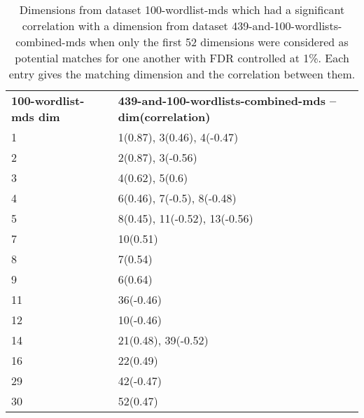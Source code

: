 \begin{table}[!tbp]
    \begin{tabular}{| p{0.75in}p{3.5in} |}
        \hline
        \textbf{100-wordlist-mds dim} & \textbf{439-and-100-wordlists-combined-mds -- dim(correlation)}\\
        1 & 1(0.87), 3(0.46), 4(-0.47)\\
        2 & 2(0.87), 3(-0.56)\\
        3 & 4(0.62), 5(0.6)\\
        4 & 6(0.46), 7(-0.5), 8(-0.48)\\
        5 & 8(0.45), 11(-0.52), 13(-0.56)\\
        7 & 10(0.51)\\
        8 & 7(0.54)\\
        9 & 6(0.64)\\
        11 & 36(-0.46)\\
        12 & 10(-0.46)\\
        14 & 21(0.48), 39(-0.52)\\
        16 & 22(0.49)\\
        29 & 42(-0.47)\\
        30 & 52(0.47)\\
        \hline
    \end{tabular}
    \caption{Dimensions from dataset 100-wordlist-mds which had a significant correlation with a dimension from dataset 439-and-100-wordlists-combined-mds when only the first 52 dimensions were considered as potential matches for one another with FDR controlled at 1\%. Each entry gives the matching dimension and the correlation between them.}
    \label{100-vs-439and100-from-800dim-lowercase-wmt-model-significant-first-52.tex}
\end{table}
